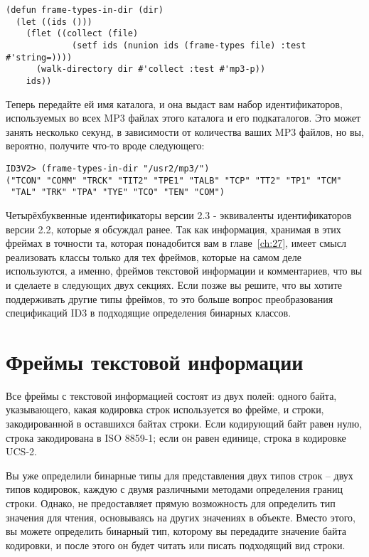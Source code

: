 \begin{lstlisting}
(defun frame-types-in-dir (dir)
  (let ((ids ()))
    (flet ((collect (file)
             (setf ids (nunion ids (frame-types file) :test #'string=))))
      (walk-directory dir #'collect :test #'mp3-p))
    ids))
\end{lstlisting}

Теперь передайте ей имя каталога, и она выдаст вам набор идентификаторов, используемых во
всех MP3 файлах этого каталога и его подкаталогов. Это может занять несколько секунд, в
зависимости от количества ваших MP3 файлов, но вы, вероятно, получите что-то вроде
следующего:

\begin{lstlisting}
ID3V2> (frame-types-in-dir "/usr2/mp3/")
("TCON" "COMM" "TRCK" "TIT2" "TPE1" "TALB" "TCP" "TT2" "TP1" "TCM"
 "TAL" "TRK" "TPA" "TYE" "TCO" "TEN" "COM")
\end{lstlisting}

Четырёхбуквенные идентификаторы версии 2.3 - эквиваленты идентификаторов версии 2.2,
которые я обсуждал ранее. Так как информация, хранимая в этих фреймах в точности та,
которая понадобится вам в главе~\ref{ch:27}, имеет смысл реализовать классы только для тех
фреймов, которые на самом деле используются, а именно, фреймов текстовой информации и
комментариев, что вы и сделаете в следующих двух секциях. Если позже вы решите, что вы
хотите поддерживать другие типы фреймов, то это больше вопрос преобразования спецификаций
ID3 в подходящие определения бинарных классов.

\section{Фреймы текстовой информации}

Все фреймы с текстовой информацией состоят из двух полей: одного байта, указывающего,
какая кодировка строк используется во фрейме, и строки, закодированной в оставшихся байтах
строки. Если кодирующий байт равен нулю, строка закодирована в ISO 8859-1; если он равен
единице, строка в кодировке UCS-2.

Вы уже определили бинарные типы для представления двух типов строк -- двух типов
кодировок, каждую с двумя различными методами определения границ строки. Однако,
 не предоставляет прямую возможность для определить тип значения
для чтения, основываясь на других значениях в объекте. Вместо этого, вы можете определить
бинарный тип, которому вы передадите значение байта кодировки, и после этого он будет
читать или писать подходящий вид строки.

